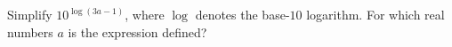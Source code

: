 Simplify $10^{\log(3a-1)}$, where $\log$ denotes the base-$10$ logarithm. For which real numbers $a$ is the expression defined?
